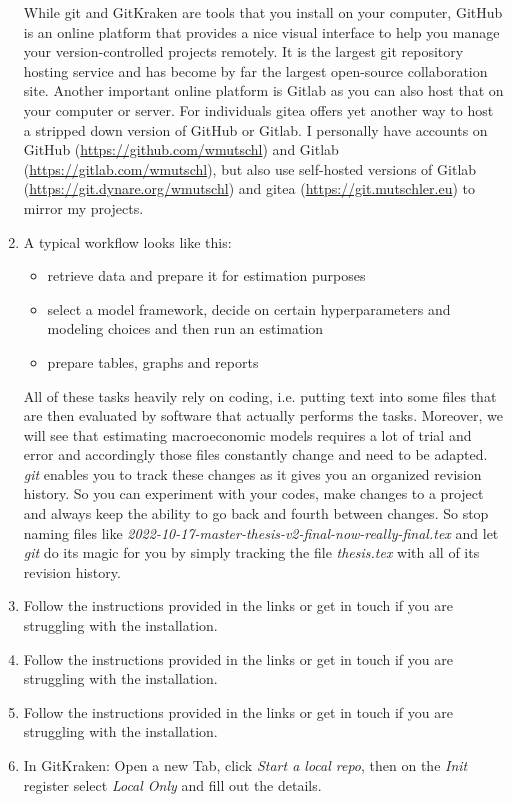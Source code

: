 \begin{enumerate}
	While git and GitKraken are tools that you install on your computer,
      GitHub is an online platform that provides a nice visual interface to help you manage your version-controlled projects remotely.
    It is the largest git repository hosting service and has become by far the largest open-source collaboration site.	
	Another important online platform is Gitlab as you can also host that on your computer or server.
	For individuals gitea offers yet another way to host a stripped down version of GitHub or Gitlab.	
	I personally have accounts on GitHub (\url{https://github.com/wmutschl}) and Gitlab (\url{https://gitlab.com/wmutschl}),
	  but also use self-hosted versions of Gitlab (\url{https://git.dynare.org/wmutschl}) and gitea (\url{https://git.mutschler.eu}) to mirror my projects.
\item A typical workflow looks like this:
	\begin{itemize}
	\item retrieve data and prepare it for estimation purposes
	\item select a model framework, decide on certain hyperparameters and modeling choices and then run an estimation
	\item prepare tables, graphs and reports
	\end{itemize}
	All of these tasks heavily rely on coding, i.e. putting text into some files that are then evaluated by software
	  that actually performs the tasks.
	Moreover, we will see that estimating macroeconomic models requires a lot of trial and error and accordingly those files constantly change and need to be adapted.
	\emph{git} enables you to track these changes as it gives you an organized revision history.
	So you can experiment with your codes, make changes to a project and always keep the ability to go back and fourth between changes.
	So stop naming files like \emph{2022-10-17-master-thesis-v2-final-now-really-final.tex}
	  and let \emph{git} do its magic for you by simply tracking the file \emph{thesis.tex} with all of its revision history.
\item Follow the instructions provided in the links or get in touch if you are struggling with the installation.
\item Follow the instructions provided in the links or get in touch if you are struggling with the installation.
\item Follow the instructions provided in the links or get in touch if you are struggling with the installation.
\item In GitKraken: Open a new Tab, click \emph{Start a local repo}, then on the \emph{Init} register select \emph{Local Only} and fill out the details.

\end{enumerate}
